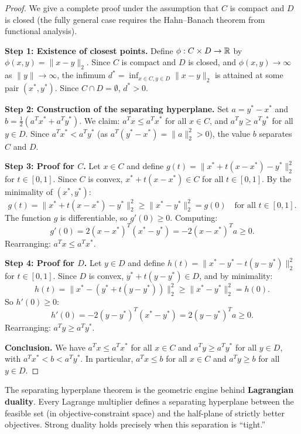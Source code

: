 \documentclass[11pt,a4paper]{article}
\begin{document}
\begin{proof}
We give a complete proof under the assumption that $C$ is compact and $D$ is
closed (the fully general case requires the Hahn--Banach theorem from
functional analysis).

\textbf{Step 1: Existence of closest points.}
Define $\phi : C \times D \to \mathbb{R}$ by $\phi(x, y) = \|x - y\|_2$.  Since $C$
is compact and $D$ is closed, and $\phi(x,y) \to \infty$ as $\|y\| \to
\infty$, the infimum $d^* = \inf_{x \in C, y \in D} \|x - y\|_2$ is attained
at some pair $(x^*, y^*)$.  Since $C \cap D = \emptyset$, $d^* > 0$.

\textbf{Step 2: Construction of the separating hyperplane.}
Set $a = y^* - x^*$ and $b = \tfrac{1}{2}(a^T x^* + a^T y^*)$.  We claim:
$a^T x \le a^T x^*$ for all $x \in C$, and $a^T y \ge a^T y^*$ for all
$y \in D$.  Since $a^T x^* < a^T y^*$ (as $a^T(y^* - x^*) = \|a\|_2^2 > 0$),
the value $b$ separates $C$ and $D$.

\textbf{Step 3: Proof for $C$.}
Let $x \in C$ and define $g(t) = \|x^* + t(x - x^*) - y^*\|_2^2$ for
$t \in [0,1]$.  Since $C$ is convex, $x^* + t(x - x^*) \in C$ for all
$t \in [0,1]$.  By the minimality of $(x^*, y^*)$:
\[
  g(t) = \|x^* + t(x - x^*) - y^*\|_2^2 \ge \|x^* - y^*\|_2^2 = g(0)
  \quad \text{for all } t \in [0,1].
\]
The function $g$ is differentiable, so $g'(0) \ge 0$.  Computing:
\[
  g'(0) = 2(x - x^*)^T(x^* - y^*) = -2(x - x^*)^T a \ge 0.
\]
Rearranging: $a^T x \le a^T x^*$.

\textbf{Step 4: Proof for $D$.}
Let $y \in D$ and define $h(t) = \|x^* - y^* - t(y - y^*)\|_2^2$ for
$t \in [0,1]$.  Since $D$ is convex, $y^* + t(y - y^*) \in D$, and by
minimality:
\[
  h(t) = \|x^* - (y^* + t(y - y^*))\|_2^2 \ge \|x^* - y^*\|_2^2 = h(0).
\]
So $h'(0) \ge 0$:
\[
  h'(0) = -2(y - y^*)^T(x^* - y^*) = 2(y - y^*)^T a \ge 0.
\]
Rearranging: $a^T y \ge a^T y^*$.

\textbf{Conclusion.}
We have $a^T x \le a^T x^*$ for all $x \in C$ and $a^T y \ge a^T y^*$ for all
$y \in D$, with $a^T x^* < b < a^T y^*$.  In particular, $a^T x \le b$ for
all $x \in C$ and $a^T y \ge b$ for all $y \in D$.
\end{proof}

\begin{keyresult}
The separating hyperplane theorem is the geometric engine behind
\textbf{Lagrangian duality}.  Every Lagrange multiplier defines a separating
hyperplane between the feasible set (in objective-constraint space) and the
half-plane of strictly better objectives.  Strong duality holds precisely when
this separation is ``tight.''
\end{keyresult}
\end{document}
